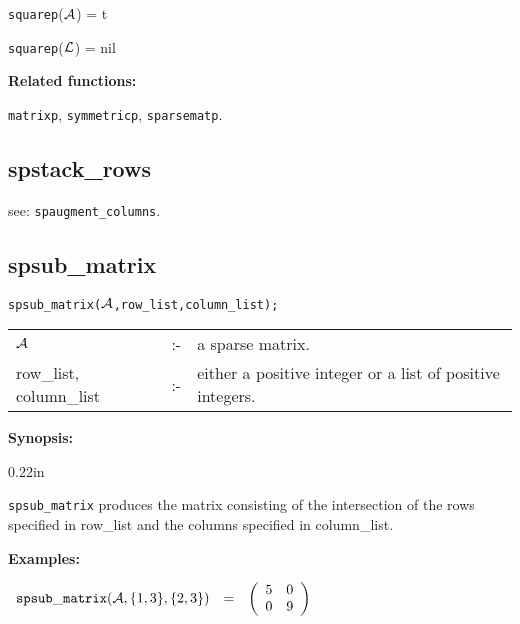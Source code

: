 \vspace*{0.1in}

\hspace*{0.175in} {\tt squarep}(${\cal A}$) = t 

\hspace*{0.175in} {\tt squarep}(${\cal L}$) = nil

{\bf Related functions:}

\hspace*{0.175in} {\tt matrixp}, {\tt symmetricp}, {\tt sparsematp}.


\subsection{spstack\_rows}

\hspace*{0.175in} see: {\tt spaugment\_columns}.


\subsection{spsub\_matrix}

\hspace*{0.175in} {\tt spsub\_matrix(${\cal A}$,row\_list,column\_list);}

\hspace*{0.1in}  
\begin{tabular}{l l l} 
${\cal A}$              &:-& a sparse matrix. \\
row\_list, column\_list &:-& \parbox[t]{.605\linewidth}{either a 
positive integer or a list of positive integers.}
\end{tabular}

{\bf Synopsis:} 


\begin{addtolength}{\leftskip}{0.22in}

{\tt spsub\_matrix} produces the matrix consisting of the
              intersection of the rows specified in row\_list and the 
columns specified in column\_list. 

\end{addtolength}

{\bf Examples:}

\begin{flushleft}  
\hspace*{0.1in}
\begin{math}  
\begin{array}{ccc}
{\tt spsub\_matrix}({\cal A},\{1,3\},\{2,3\}) & = & 
        \left( \begin{array}{cc} 5 & 0\\ 0 & 9
 \end{array} \right) 
\end{array}
\end{math}  
\end{flushleft}

